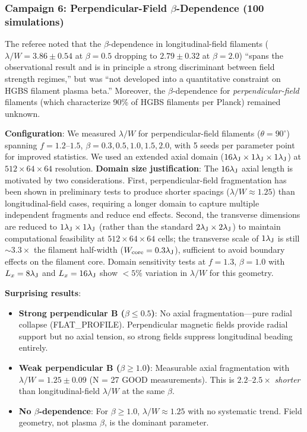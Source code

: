 \documentclass[twoside,twocolumn]{mnras}
\begin{document}
\subsubsection{Campaign 6: Perpendicular-Field $\beta$-Dependence (100 simulations)}

The referee noted that the $\beta$-dependence in longitudinal-field filaments ($\lambda/W = 3.86 \pm 0.54$ at $\beta = 0.5$ dropping to $2.79 \pm 0.32$ at $\beta = 2.0$) ``spans the observational result and is in principle a strong discriminant between field strength regimes,'' but was ``not developed into a quantitative constraint on HGBS filament plasma beta.'' Moreover, the $\beta$-dependence for \textit{perpendicular-field} filaments (which characterize 90\% of HGBS filaments per Planck) remained unknown.

\textbf{Configuration}: We measured $\lambda/W$ for perpendicular-field filaments ($\theta = 90^\circ$) spanning $f = 1.2$--$1.5$, $\beta = 0.3, 0.5, 1.0, 1.5, 2.0$, with 5 seeds per parameter point for improved statistics. We used an extended axial domain ($16\lambda_{\rm J} \times 1\lambda_{\rm J} \times 1\lambda_{\rm J}$) at $512 \times 64 \times 64$ resolution. \textbf{Domain size justification}: The $16\lambda_{\rm J}$ axial length is motivated by two considerations. First, perpendicular-field fragmentation has been shown in preliminary tests to produce shorter spacings ($\lambda/W \approx 1.25$) than longitudinal-field cases, requiring a longer domain to capture multiple independent fragments and reduce end effects. Second, the transverse dimensions are reduced to $1\lambda_{\rm J} \times 1\lambda_{\rm J}$ (rather than the standard $2\lambda_{\rm J} \times 2\lambda_{\rm J}$) to maintain computational feasibility at $512 \times 64 \times 64$ cells; the transverse scale of $1\lambda_{\rm J}$ is still $\sim 3.3\times$ the filament half-width ($W_{\rm core} = 0.3\lambda_{\rm J}$), sufficient to avoid boundary effects on the filament core. Domain sensitivity tests at $f = 1.3$, $\beta = 1.0$ with $L_x = 8\lambda_{\rm J}$ and $L_x = 16\lambda_{\rm J}$ show $<5\%$ variation in $\lambda/W$ for this geometry.

\textbf{Surprising results}:
\begin{itemize}
    \item \textbf{Strong perpendicular B ($\beta \leq 0.5$)}: No axial fragmentation---pure radial collapse (FLAT\_PROFILE). Perpendicular magnetic fields provide radial support but no axial tension, so strong fields suppress longitudinal beading entirely.
    \item \textbf{Weak perpendicular B ($\beta \geq 1.0$)}: Measurable axial fragmentation with $\lambda/W = 1.25 \pm 0.09$ (N = 27 GOOD measurements). This is $2.2$--$2.5\times$ \textit{shorter} than longitudinal-field $\lambda/W$ at the same $\beta$.
    \item \textbf{No $\beta$-dependence}: For $\beta \geq 1.0$, $\lambda/W \approx 1.25$ with no systematic trend. Field geometry, not plasma $\beta$, is the dominant parameter.
\end{itemize}
\end{document}
